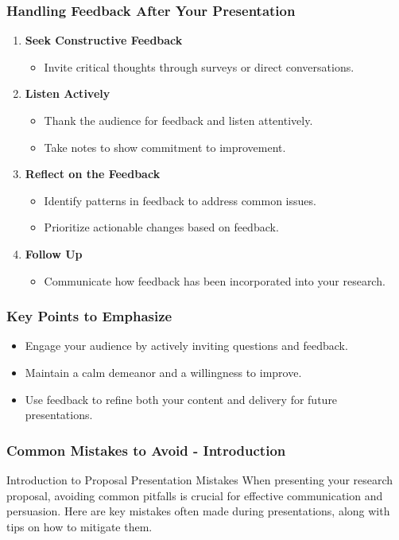 \documentclass[aspectratio=169]{beamer}
\begin{document}
\begin{frame}[fragile]
  \frametitle{Handling Feedback After Your Presentation}
  \begin{enumerate}
    \item \textbf{Seek Constructive Feedback}
      \begin{itemize}
        \item Invite critical thoughts through surveys or direct conversations.
      \end{itemize}

    \item \textbf{Listen Actively}
      \begin{itemize}
        \item Thank the audience for feedback and listen attentively.
        \item Take notes to show commitment to improvement.
      \end{itemize}

    \item \textbf{Reflect on the Feedback}
      \begin{itemize}
        \item Identify patterns in feedback to address common issues.
        \item Prioritize actionable changes based on feedback.
      \end{itemize}

    \item \textbf{Follow Up}
      \begin{itemize}
        \item Communicate how feedback has been incorporated into your research.
      \end{itemize}
  \end{enumerate}
\end{frame}

\begin{frame}[fragile]
  \frametitle{Key Points to Emphasize}
  \begin{itemize}
    \item Engage your audience by actively inviting questions and feedback.
    \item Maintain a calm demeanor and a willingness to improve.
    \item Use feedback to refine both your content and delivery for future presentations.
  \end{itemize}
\end{frame}

\begin{frame}[fragile]
  \frametitle{Common Mistakes to Avoid - Introduction}
  \begin{block}{Introduction to Proposal Presentation Mistakes}
    When presenting your research proposal, avoiding common pitfalls is crucial for effective communication and persuasion. Here are key mistakes often made during presentations, along with tips on how to mitigate them.
  \end{block}
\end{frame}
\end{document}
